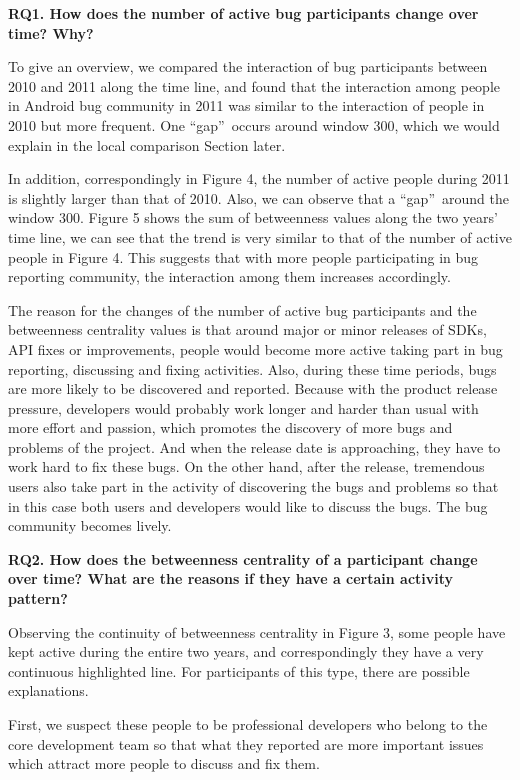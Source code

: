 \documentclass[10pt, conference, compsocconf]{IEEEtran}
\begin{document}
\textbf{RQ1. How does the number of active bug participants change over time? Why?}

To give an overview, we compared the interaction of bug participants between 2010 and 2011 along the time line, and found that the interaction among people in Android bug community in 2011 was similar to the interaction of people in 2010 but more frequent. One  \textquotedblleft gap\textquotedblright \ occurs around window 300, which we would explain in the local comparison Section later. 

In addition, correspondingly in Figure 4, the number of active people during 2011 is slightly larger than that of 2010. Also, we can observe that a \textquotedblleft gap\textquotedblright \ around the window 300. Figure 5 shows the sum of betweenness values along the two years' time line, we can see that the trend is very similar to that of the number of active people in Figure 4. This suggests that with more people participating in bug reporting community, the interaction among them increases accordingly.

The reason for the changes of the number of active bug participants and the betweenness centrality values is that around major or minor releases of SDKs, API fixes or improvements, people would become more active taking part in bug reporting, discussing and fixing activities. Also, during these time periods, bugs are more likely to be discovered and reported. Because with the product release pressure, developers would probably work longer and harder than usual with more effort and passion, which promotes the discovery of more bugs and problems of the project. And when the release date is approaching, they have to work hard to fix these bugs. On the other hand, after the release, tremendous users also take part in the activity of discovering the bugs and problems so that in this case both users and developers would like to discuss the bugs. The bug community becomes lively. 

\textbf{RQ2. How does the betweenness centrality of a participant change over time? What are the reasons if they have a certain activity pattern?}

Observing the continuity of betweenness centrality in Figure 3, some people have kept active during the entire two years, and correspondingly they have a very continuous highlighted line. For participants of this type, there are possible explanations. 

First, we suspect these people to be professional developers who belong to the core development team so that what they reported are more important issues which attract more people to discuss and fix them. 
\end{document}
